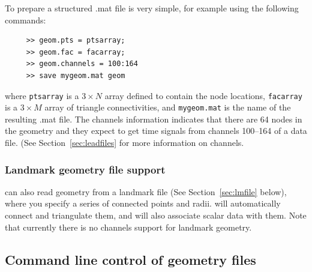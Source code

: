 To prepare a structured .mat file is very simple, for example using the
following commands:
%
\begin{verbatim}
     >> geom.pts = ptsarray;
     >> geom.fac = facarray;
     >> geom.channels = 100:164
     >> save mygeom.mat geom
\end{verbatim}
%
where \verb|ptsarray| is a $3 \times N$ array defined to contain the node
locations, \verb|facarray| is a $3 \times M$ array of triangle
connectivities, and \verb|mygeom.mat| is the name of the resulting .mat
file.   The channels information indicates that there are 64 nodes in the
geometry and they expect to get time signals from channels 100--164 of a
data file.  (See Section~\ref{sec:leadfiles} for more information on
channels. 

\subsubsection{Landmark geometry file support}
\label{sec:landmarkgeom}

\map{} can also read geometry from a landmark file 
(See Section~\ref{sec:lmfile} below), where you specify a series
of connected points and radii.  \map{} will automatically connect
and triangulate them, and will also associate scalar data with them.
Note that currently there is no channels support for landmark geometry.



\subsection{Command line control of geometry files}
\label{sec:readgeom}


